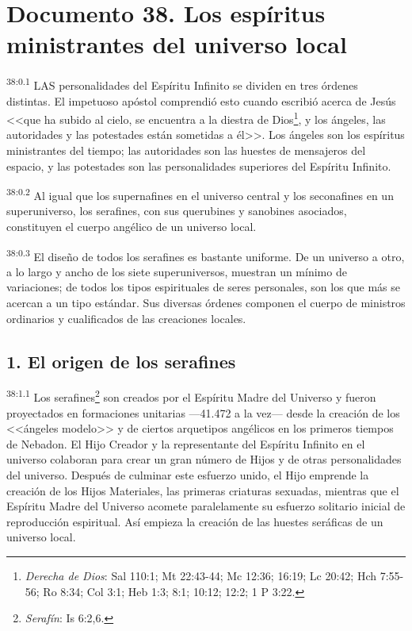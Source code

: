 \chapter{Documento 38. Los espíritus ministrantes del universo local}
\par
\textsuperscript{38:0.1} LAS personalidades del Espíritu Infinito se dividen en tres órdenes distintas. El impetuoso apóstol comprendió esto cuando escribió acerca de Jesús <<que ha subido al cielo, se encuentra a la diestra de Dios\footnote{\textit{Derecha de Dios}: Sal 110:1; Mt 22:43-44; Mc 12:36; 16:19; Lc 20:42; Hch 7:55-56; Ro 8:34; Col 3:1; Heb 1:3; 8:1; 10:12; 12:2; 1 P 3:22.}, y los ángeles, las autoridades y las potestades están sometidas a él>>. Los ángeles son los espíritus ministrantes del tiempo; las autoridades son las huestes de mensajeros del espacio, y las potestades son las personalidades superiores del Espíritu Infinito.

\par
\textsuperscript{38:0.2} Al igual que los supernafines en el universo central y los seconafines en un superuniverso, los serafines, con sus querubines y sanobines asociados, constituyen el cuerpo angélico de un universo local.

\par
\textsuperscript{38:0.3} El diseño de todos los serafines es bastante uniforme. De un universo a otro, a lo largo y ancho de los siete superuniversos, muestran un mínimo de variaciones; de todos los tipos espirituales de seres personales, son los que más se acercan a un tipo estándar. Sus diversas órdenes componen el cuerpo de ministros ordinarios y cualificados de las creaciones locales.

\section*{1. El origen de los serafines}
\par
\textsuperscript{38:1.1} Los serafines\footnote{\textit{Serafín}: Is 6:2,6.} son creados por el Espíritu Madre del Universo y fueron proyectados en formaciones unitarias ---41.472 a la vez--- desde la creación de los <<ángeles modelo>> y de ciertos arquetipos angélicos en los primeros tiempos de Nebadon. El Hijo Creador y la representante del Espíritu Infinito en el universo colaboran para crear un gran número de Hijos y de otras personalidades del universo. Después de culminar este esfuerzo unido, el Hijo emprende la creación de los Hijos Materiales, las primeras criaturas sexuadas, mientras que el Espíritu Madre del Universo acomete paralelamente su esfuerzo solitario inicial de reproducción espiritual. Así empieza la creación de las huestes seráficas de un universo local.

